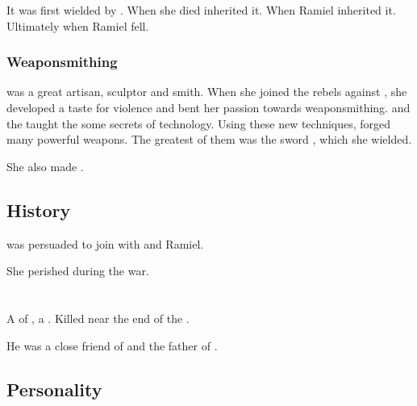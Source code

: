 It was first wielded by \Lyorith. 
When she died \Nathrach{} inherited it. 
When  Ramiel inherited it. 
Ultimately  when Ramiel fell. 





\subsubsection{Weaponsmithing}
\Lyorith{} was a great artisan, sculptor and smith. 
When she joined the rebels against \Merkyrah, she developed a taste for violence and bent her passion towards weaponsmithing. 
\Semiza{} and the \banelords{} taught the \resphain{} some secrets of technology. 
Using these new techniques, \Lyorith{} forged many powerful weapons. 
The greatest of them was the sword , which she wielded. 

She also made . 









\subsection{History}
\Lyorith{} was persuaded to join \Mystraacht{} with \Nathrach{} and Ramiel. 

She perished during the \Merkyran{} war. 















\section[Nathrach]{\Nathrach}
\index{\Nathrach}
A \resphan{} of \Mystraacht, a \sathariah. 
Killed near the end of the \secondbanewar. 

He was a close friend of  and the father of . 









\subsection{Personality}
